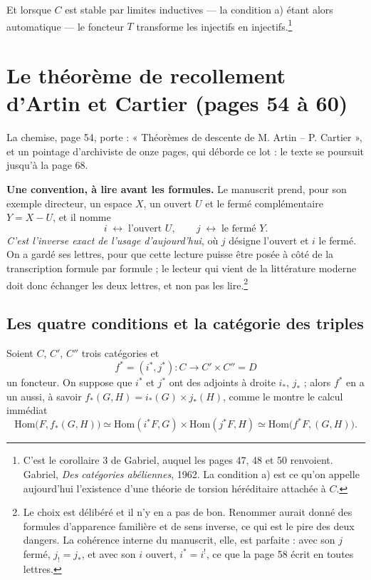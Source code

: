 \documentclass[11pt,a4paper]{article}
\begin{document}
Et lorsque $C$ est stable par limites inductives — la condition a) étant alors
automatique — le foncteur $T$ transforme les injectifs en
injectifs.\footnote{C'est le corollaire 3 de Gabriel, auquel les pages 47, 48
et 50 renvoient. Gabriel, \emph{Des catégories abéliennes}, 1962. La condition
a) est ce qu'on appelle aujourd'hui l'existence d'une théorie de torsion
héréditaire attachée à $C$.}

\section*{Le théorème de recollement d'Artin et Cartier (pages 54 à 60)}

La chemise, page 54, porte : « Théorèmes de descente de M. Artin --
P. Cartier », et un pointage d'archiviste de onze pages, qui déborde ce lot :
le texte se poursuit jusqu'à la page 68.


\textbf{Une convention, à lire avant les formules.} Le manuscrit
prend, pour son exemple directeur, un espace $X$, un ouvert $U$ et le fermé
complémentaire $Y = X - U$, et il nomme
\[
  i \;\longleftrightarrow\; \text{l'ouvert } U , \qquad
  j \;\longleftrightarrow\; \text{le fermé } Y .
\]
\emph{C'est l'inverse exact de l'usage d'aujourd'hui}, où $j$ désigne l'ouvert
et $i$ le fermé. On a gardé ses lettres, pour que cette lecture puisse être
posée à côté de la transcription formule par formule ; le lecteur qui vient de
la littérature moderne doit donc échanger les deux lettres, et non pas les
lire.\footnote{Le choix est délibéré et il n'y en a pas de bon. Renommer aurait
donné des formules d'apparence familière et de sens inverse, ce qui est le pire
des deux dangers. La cohérence interne du manuscrit, elle, est parfaite : avec
son $j$ fermé, $j_{!} = j_{*}$, et avec son $i$ ouvert, $i^{*} = i^{!}$, ce que
la page 58 écrit en toutes lettres.}

\subsection*{Les quatre conditions et la catégorie des triples}

Soient $C$, $C'$, $C''$ trois catégories et
\[
  f^{*} = (i^{*}, j^{*}) : C \longrightarrow C' \times C'' = D
\]
un foncteur. On suppose que $i^{*}$ et $j^{*}$ ont des adjoints à droite
$i_{*}$, $j_{*}$ ; alors $f^{*}$ en a un aussi, à savoir
$f_{*}(G,H) = i_{*}(G) \times j_{*}(H)$, comme le montre le calcul immédiat
\[
  \mathrm{Hom}\bigl( F, f_{*}(G,H) \bigr) \simeq
  \mathrm{Hom}(i^{*}F, G) \times \mathrm{Hom}(j^{*}F, H) \simeq
  \mathrm{Hom}\bigl( f^{*}F, (G,H) \bigr) .
\]
\end{document}

